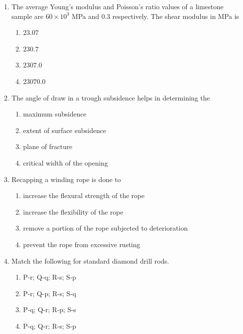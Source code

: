 \documentclass[journal,12pt,onecolumn]{IEEEtran}
\theoremstyle{remark}
\begin{document}
\begin{enumerate}
 \item The average Young's modulus and Poisson's ratio values of a limestone sample are $60 \times 10^3$ MPa and $0.3$ respectively. The shear modulus in MPa is
\hfill{}
\begin{multicols}{4}
\begin{enumerate}
\item $23.07$
\item $230.7$
\item $2307.0$
\item $23070.0$
\end{enumerate}
\end{multicols}

\item The angle of draw in a trough subsidence helps in determining the

\hfill{}
\begin{multicols}{2}
\begin{enumerate}
\item maximum subsidence
\item extent of surface subsidence
\item plane of fracture
\item critical width of the opening
\end{enumerate}
\end{multicols}

\item Recapping a winding rope is done to

\hfill{}
\begin{enumerate}
\item increase the flexural strength of the rope
\item increase the flexibility of the rope
\item remove a portion of the rope subjected to deterioration
\item  prevent the rope from excessive rusting
\end{enumerate}

\item Match the following for standard diamond drill rods.
\vspace{0.5em}

\hfill{}
\begin{table}[H]

\end{table}
\begin{multicols}{2}
\begin{enumerate}
\item P-r; Q-q; R-s; S-p  
\item P-r; Q-p; R-s; S-q  
\item P-q; Q-r; R-p; S-s  
\item P-q; Q-r; R-s; S-p  
\end{enumerate}
\end{multicols}


\end{enumerate}
\end{document}
